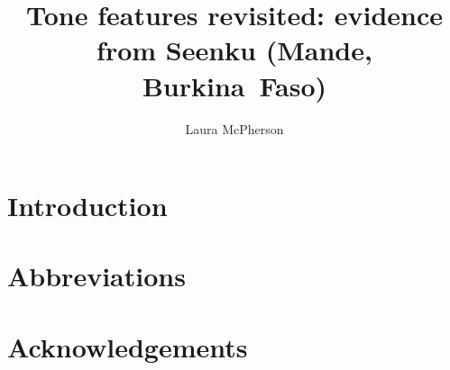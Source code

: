 \documentclass[output=paper]{langsci/langscibook}
\title{Tone features revisited: evidence from Seenku (Mande, Burkina Faso)}
\author{%
Laura McPherson \affiliation{} 
}
\begin{document}
\section{Introduction} 

\section*{Abbreviations}
\section*{Acknowledgements}

\printbibliography[heading=subbibliography,notkeyword=this]
\end{document}
